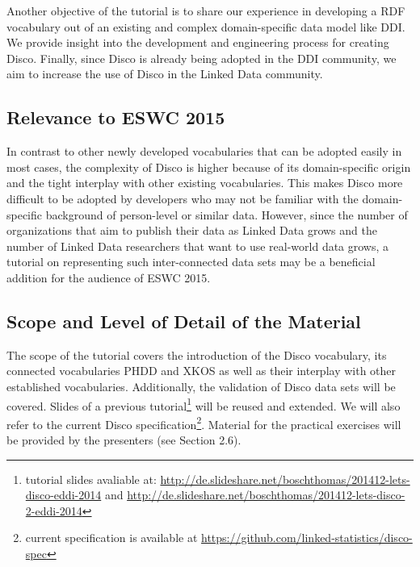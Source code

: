 \documentclass{llncs}
\begin{document}
Another objective of the tutorial is to share our experience in developing a RDF vocabulary out of an existing and complex domain-specific data model like DDI. We provide insight into the development and engineering process for creating Disco.
Finally, since Disco is already being adopted in the DDI community, we aim to increase the use of Disco in the Linked Data community.

\subsection{Relevance to ESWC 2015}
In contrast to other newly developed vocabularies that can be adopted easily in most cases, the complexity of Disco is higher because of its domain-specific origin and the tight interplay with other existing vocabularies. This makes Disco more difficult to be adopted by developers who may not be familiar with the domain-specific background of person-level or similar data. However, since the number of organizations that aim to publish their data as Linked Data grows and the number of Linked Data researchers that want to use real-world data grows, a tutorial on representing such inter-connected data sets may be a beneficial addition for the audience of ESWC 2015.

\subsection{Scope and Level of Detail of the Material}

The scope of the tutorial covers the introduction of the Disco vocabulary, its connected vocabularies PHDD and XKOS as well as their interplay with other established vocabularies.
Additionally, the validation of Disco data sets will be covered.
Slides of a previous tutorial\footnote{tutorial slides avaliable at: \url{http://de.slideshare.net/boschthomas/201412-lets-disco-eddi-2014} and \url{http://de.slideshare.net/boschthomas/201412-lets-disco-2-eddi-2014}} 
will be reused and extended. We will also refer to the current Disco specification\footnote{current specification is available at \url{https://github.com/linked-statistics/disco-spec}}.
Material for the practical exercises will be provided by the presenters (see Section 2.6).
\end{document}
